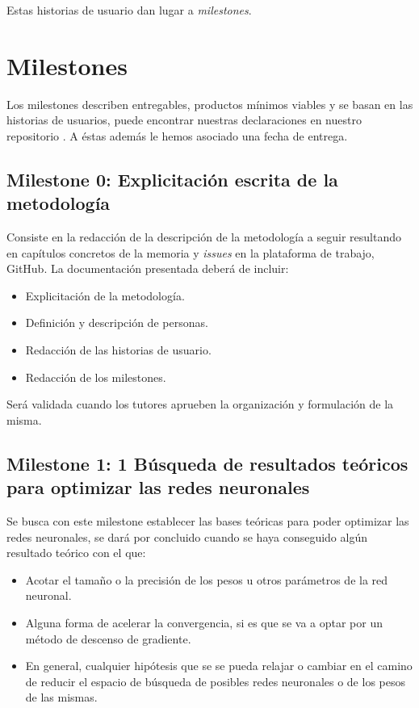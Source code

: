 
Estas historias de usuario dan lugar a \textit{milestones}. 

\section{Milestones}  

Los milestones describen entregables, productos mínimos viables y se basan en las historias de usuarios,
puede encontrar nuestras declaraciones en nuestro repositorio \cite{TFG-Estudio-de-las-redes-neuronales-milestones}. 
A éstas además le hemos asociado una fecha de entrega. 


\subsection*{Milestone 0: Explicitación escrita de la metodología} 
Consiste en la redacción de la descripción de la metodología a seguir resultando en capítulos concretos de la memoria 
y \textit{issues} en la plataforma de trabajo, GitHub.  
La documentación presentada deberá de incluir: 
\begin{itemize}
    \item Explicitación de la metodología. 
    \item Definición y descripción de personas.
    \item Redacción de las historias de usuario.
    \item Redacción de los milestones.
\end{itemize}
Será validada cuando los tutores aprueben la organización y formulación de la misma.


\subsection*{Milestone 1: 1 Búsqueda de resultados teóricos para optimizar  las redes neuronales}

Se busca con este milestone establecer las bases teóricas para poder optimizar las redes neuronales, se dará por concluido cuando se haya conseguido algún resultado teórico con el que:
\begin{itemize}
    \item Acotar el tamaño o la precisión de los pesos u otros parámetros de la red neuronal.
    \item Alguna forma de acelerar la convergencia, si es que se va a optar por un método de descenso de gradiente.
    \item En general, cualquier hipótesis que se se pueda relajar o cambiar en el camino de reducir el espacio de búsqueda de posibles redes neuronales o de los pesos de las mismas.
\end{itemize}

